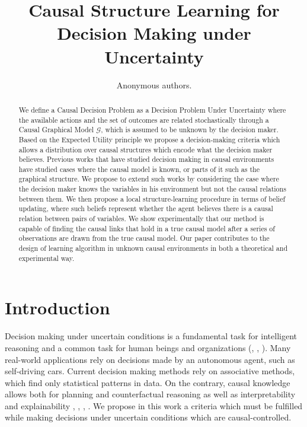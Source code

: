 \documentclass[letterpaper]{article}
\title{Causal Structure Learning for Decision Making under Uncertainty}
\author{Anonymous authors.} %
\begin{document}
\maketitle

\begin{abstract}
We define a Causal Decision Problem as a Decision Problem Under Uncertainty where the available actions and the set of outcomes are related stochastically through a Causal Graphical Model $\mathcal{G}$, which is assumed to be unknown by the decision maker. Based on the Expected Utility principle we propose a decision-making criteria which allows a distribution over causal structures which encode what the decision maker believes. Previous works that have studied decision making in causal environments have studied cases where the causal model is known, or parts of it such as the graphical structure. We propose to extend such works by considering the case where the decision maker knows the variables in his environment but not the causal relations between them. We then propose a local structure-learning procedure in terms of belief updating, where such beliefs represent whether the agent believes there is a causal relation between pairs of variables. We show experimentally that our method is capable of finding the causal links that hold in a true causal model after a series of observations are drawn from the true causal model. Our paper contributes to the design of learning algorithm in unknown causal environments in both a theoretical and experimental way.
\end{abstract}

\section{Introduction}
Decision making under uncertain conditions is a fundamental task for intelligent reasoning and a common task for human beings and organizations (\cite{savage1954the}, \cite{danks2014unifying}, \cite{lake2017building}). Many real-world applications rely on decisions made by an autonomous agent, such as self-driving cars. Current decision making methods rely on associative methods, which find only statistical patterns in data. On the contrary, causal knowledge allows both for planning and counterfactual reasoning as well as interpretability and explainability \cite{spirtes2000causation}, \cite{pearl2009causality}, \cite{woodward2005making}, \cite{pearl2018why}. We propose in this work a criteria which must be fulfilled while making decisions under uncertain conditions which are causal-controlled.
\end{document}
